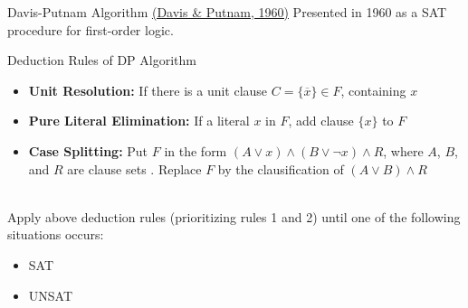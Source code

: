 \documentclass[t]{sdqbeamer}
\begin{document}
\begin{frame}{Davis-Putnam Algorithm \href{http://doi.acm.org/10.1145/321033.321034}{(Davis \& Putnam, 1960)}}
Presented in 1960 as a SAT procedure for first-order logic.
\begin{block}{Deduction Rules of DP Algorithm}
\begin{itemize}\setlength{\itemsep}{1em}
	\item \textbf{Unit Resolution:} If there is a unit clause $C = \{ \overline x \} \in F$, 
	 containing $x$
	\item \textbf{Pure Literal Elimination:} If a literal $x$  in $F$, add clause $\{ x \}$ to $F$
	\item \textbf{Case Splitting:} Put $F$ in the form $(A \lor x) \land (B \lor \lnot x) \land R$,
	where $A$, $B$, and $R$ are clause sets .
	Replace $F$ by the clausification of $(A \lor B) \land R$
\end{itemize}~\\
Apply above deduction rules (prioritizing rules 1 and 2) until one of the following situations occurs: 
\begin{itemize}
	\item {} SAT
	\item {} UNSAT
\end{itemize}
\end{block}
\end{frame}
\end{document}
